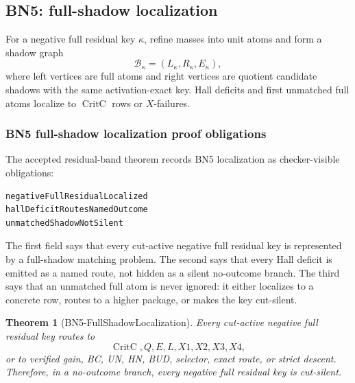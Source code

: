 \documentclass[10.5pt,a4paper]{article}
\newtheorem{theorem}{Theorem}[section]
\newcommand{\CritC}{\operatorname{CritC}}
\begin{document}
\subsection{BN5: full-shadow localization}
For a negative full residual key \(\kappa\), refine masses into unit atoms and form a shadow graph
\[
\mathcal B_\kappa=(L_\kappa,R_\kappa,E_\kappa),
\]
where left vertices are full atoms and right vertices are quotient candidate shadows with the same activation-exact key. Hall deficits and first unmatched full atoms localize to \(\CritC\) rows or \(X\)-failures.

\subsubsection{BN5 full-shadow localization proof obligations}
The accepted residual-band theorem records BN5 localization as checker-visible obligations:
\begin{lstlisting}
negativeFullResidualLocalized
hallDeficitRoutesNamedOutcome
unmatchedShadowNotSilent
\end{lstlisting}
The first field says that every cut-active negative full residual key is represented by a full-shadow matching problem.  The second says that every Hall deficit is emitted as a named route, not hidden as a silent no-outcome branch.  The third says that an unmatched full atom is never ignored: it either localizes to a concrete row, routes to a higher package, or makes the key cut-silent.

\begin{theorem}[BN5-FullShadowLocalization]
Every cut-active negative full residual key routes to
\[
\CritC,Q,E,L,X1,X2,X3,X4,
\]
or to verified gain, BC, UN, HN, BUD, selector, exact route, or strict descent. Therefore, in a no-outcome branch, every negative full residual key is cut-silent.
\end{theorem}
\end{document}
